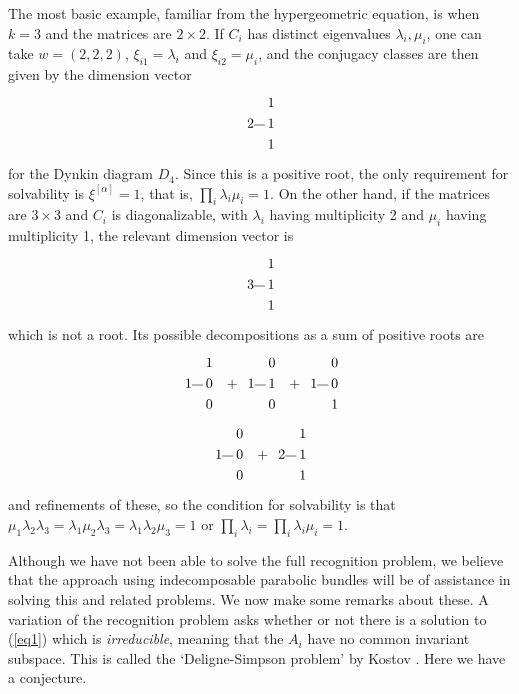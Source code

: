 \documentclass{amsart}
\theoremstyle{plain}
\theoremstyle{definition}
\theoremstyle{remark}
\begin{document}
The most basic example, familiar from the hypergeometric equation, is when $k=3$ and
the matrices are $2\times 2$. If $C_i$ has distinct eigenvalues $\lambda_i,\mu_i$,
one can take $w=(2,2,2)$, $\xi_{i1}=\lambda_i$ and $\xi_{i2}=\mu_i$, and
the conjugacy classes are then given by the dimension vector
\[
\begin{picture}(18,40)
\put(0,15){2}
\put(15,0){1}
\put(15,15){1}
\put(15,30){1}
\put(13,5){\line(-1,1){8}}
\put(13,17){\line(-1,0){8}}
\put(13,29){\line(-1,-1){8}}
\end{picture}
\]
for the Dynkin diagram $D_4$. Since this is a positive root, the only requirement
for solvability is $\xi^{[\alpha]}=1$, that is, $\prod_i \lambda_i\mu_i=1$.
On the other hand, if the matrices are $3\times 3$ and $C_i$ is diagonalizable, with $\lambda_i$
having multiplicity 2 and $\mu_i$ having multiplicity 1, the relevant dimension vector is
\[
\begin{picture}(18,40)
\put(0,15){3}
\put(15,0){1}
\put(15,15){1}
\put(15,30){1}
\put(13,5){\line(-1,1){8}}
\put(13,17){\line(-1,0){8}}
\put(13,29){\line(-1,-1){8}}
\end{picture}
\]
which is not a root. Its possible decompositions as a sum of positive roots are
\[
\begin{picture}(108,40)
\put(0,15){1}
\put(15,0){0}
\put(15,15){0}
\put(15,30){1}
\put(13,5){\line(-1,1){8}}
\put(13,17){\line(-1,0){8}}
\put(13,29){\line(-1,-1){8}}
%
\put(30,15){$+$}
%
\put(45,15){1}
\put(60,0){0}
\put(60,15){1}
\put(60,30){0}
\put(58,5){\line(-1,1){8}}
\put(58,17){\line(-1,0){8}}
\put(58,29){\line(-1,-1){8}}
%
\put(75,15){$+$}
%
\put(90,15){1}
\put(105,0){1}
\put(105,15){0}
\put(105,30){0}
\put(103,5){\line(-1,1){8}}
\put(103,17){\line(-1,0){8}}
\put(103,29){\line(-1,-1){8}}
\end{picture}
\]
\[
\begin{picture}(63,40)
\put(0,15){1}
\put(15,0){0}
\put(15,15){0}
\put(15,30){0}
\put(13,5){\line(-1,1){8}}
\put(13,17){\line(-1,0){8}}
\put(13,29){\line(-1,-1){8}}
%
\put(30,15){$+$}
%
\put(45,15){2}
\put(60,0){1}
\put(60,15){1}
\put(60,30){1}
\put(58,5){\line(-1,1){8}}
\put(58,17){\line(-1,0){8}}
\put(58,29){\line(-1,-1){8}}
\end{picture}
\]
and refinements of these, so the condition for solvability is that
$\mu_1\lambda_2\lambda_3=\lambda_1\mu_2\lambda_3=\lambda_1\lambda_2\mu_3=1$
or $\prod_i \lambda_i = \prod_i \lambda_i\mu_i=1$.


Although we have not been able to solve the full recognition problem, we
believe that the approach using indecomposable parabolic bundles will be
of assistance in solving this and related problems. We now make some
remarks about these. A variation of the recognition problem
asks whether or not there is a solution to (\ref{eq1}) which is \emph{irreducible},
meaning that the $A_i$ have no common invariant subspace.
This is called the `Deligne-Simpson problem' by Kostov
\cite{Kostovmon,KostovCR,Kostovaspects,Kostovsurvey}.
Here we have a conjecture.
\end{document}
